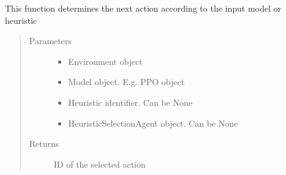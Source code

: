 \documentclass[letterpaper,10pt,english]{sphinxmanual}
\begin{document}
\begin{fulllineitems}
\label{\detokenize{agents.reinforcement_learning:agents.test.get_action}}
\sphinxAtStartPar
This function determines the next action according to the input model or heuristic
\begin{quote}\begin{description}
\item[{Parameters}] \leavevmode\begin{itemize}
\item {} 
\sphinxAtStartPar
{} \textendash{} Environment object

\item {} 
\sphinxAtStartPar
{} \textendash{} Model object. E.g. PPO object

\item {} 
\sphinxAtStartPar
{} \textendash{} Heuristic identifier. Can be None

\item {} 
\sphinxAtStartPar
{} \textendash{} HeuristicSelectionAgent object. Can be None

\end{itemize}

\item[{Returns}] \leavevmode
\sphinxAtStartPar
ID of the selected action

\end{description}\end{quote}

\end{fulllineitems}

\end{document}
